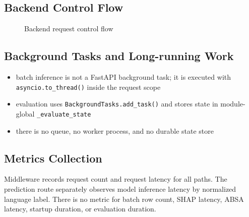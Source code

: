 \subsection{Backend Control Flow}
\begin{figure}[H]
\centering
{}
\caption{Backend request control flow}
\end{figure}

\subsection{Background Tasks and Long-running Work}
\begin{itemize}[leftmargin=1.2em]
  \item batch inference is not a FastAPI background task; it is executed with \texttt{asyncio.to\_thread()} inside the request scope
  \item evaluation uses \texttt{BackgroundTasks.add\_task()} and stores state in module-global \texttt{\_evaluate\_state}
  \item there is no queue, no worker process, and no durable state store
\end{itemize}

\subsection{Metrics Collection}
Middleware records request count and request latency for all paths. The prediction route separately observes model inference latency by normalized language label. There is no metric for batch row count, SHAP latency, ABSA latency, startup duration, or evaluation duration.

